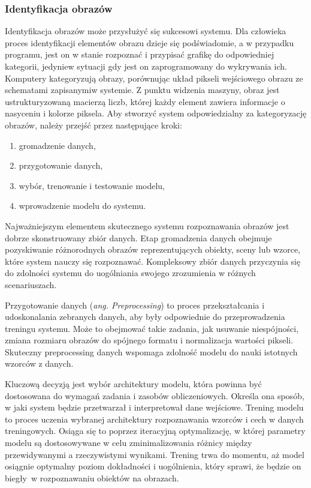 \documentclass[12pt,a4paper,twoside]{article}
\begin{document}
\subsubsection{Identyfikacja obrazów}
Identyfikacja obrazów może przysłużyć się sukcesowi systemu. Dla człowieka proces identyfikacji elementów obrazu dzieje się podświadomie, a w przypadku programu, jest on w stanie rozpoznać i przypisać grafikę do odpowiedniej kategorii, jedynie\break w sytuacji gdy jest on zaprogramowany do wykrywania ich. Komputery kategoryzują obrazy, porównując układ pikseli wejściowego obrazu ze schematami zapisanymi\break w systemie. Z punktu widzenia maszyny, obraz jest ustrukturyzowaną macierzą liczb, której każdy element zawiera informacje o nasyceniu i kolorze piksela. Aby stworzyć system odpowiedzialny za kategoryzację obrazów, należy przejść przez następujące kroki:
\begin{enumerate}
	\item gromadzenie danych,
	\item przygotowanie danych,
	\item wybór, trenowanie i testowanie modelu,
	\item wprowadzenie modelu do systemu.
\end{enumerate}
Najważniejszym elementem skutecznego systemu rozpoznawania obrazów jest dobrze skonstruowany zbiór danych. Etap gromadzenia danych obejmuje pozyskiwanie różnorodnych obrazów reprezentujących obiekty, sceny lub wzorce, które system nauczy się rozpoznawać. Kompleksowy zbiór danych przyczynia się do zdolności systemu do uogólniania swojego zrozumienia w różnych scenariuszach.\par
Przygotowanie danych (\textit{ang. Preprocessing}) to proces przekształcania i udoskonalania zebranych danych, aby były odpowiednie do przeprowadzenia treningu systemu. Może to obejmować takie zadania, jak usuwanie niespójności, zmiana rozmiaru obrazów do spójnego formatu i normalizacja wartości pikseli. Skuteczny preprocessing danych wspomaga zdolność modelu do nauki istotnych wzorców z danych.\par
Kluczową decyzją jest wybór architektury modelu, która powinna być dostosowana do wymagań zadania i zasobów obliczeniowych. Określa ona sposób, w jaki system będzie przetwarzał i interpretował dane wejściowe. Trening modelu to proces uczenia wybranej architektury rozpoznawania wzorców i cech w danych treningowych. Osiąga się to poprzez iteracyjną optymalizację, w której parametry modelu są dostosowywane w celu zminimalizowania różnicy między przewidywanymi a rzeczywistymi wynikami. Trening trwa do momentu, aż model osiągnie optymalny poziom dokładności i uogólnienia, który sprawi, że będzie on biegły\ w rozpoznawaniu obiektów na obrazach. \par
\end{document}
